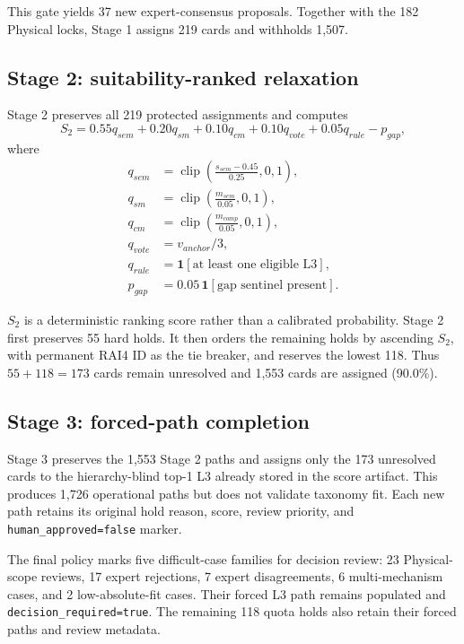 \documentclass[11pt,a4paper]{article}
\newcommand{\code}[1]{\texttt{#1}}
\begin{document}
This gate yields 37 new expert-consensus proposals. Together with the 182
Physical locks, Stage 1 assigns 219 cards and withholds 1,507.

\subsection{Stage 2: suitability-ranked relaxation}

Stage 2 preserves all 219 protected assignments and computes
\begin{equation}
S_2=0.55q_{sem}+0.20q_{sm}+0.10q_{cm}+0.10q_{vote}+0.05q_{rule}-p_{gap},
\end{equation}
where
\begin{align}
q_{sem}&=\operatorname{clip}\left(\frac{s_{sem}-0.45}{0.25},0,1\right),\\
q_{sm}&=\operatorname{clip}\left(\frac{m_{sem}}{0.05},0,1\right),\\
q_{cm}&=\operatorname{clip}\left(\frac{m_{comp}}{0.05},0,1\right),\\
q_{vote}&=v_{anchor}/3,\\
q_{rule}&=\mathbf{1}[\text{at least one eligible L3}],\\
p_{gap}&=0.05\,\mathbf{1}[\text{gap sentinel present}].
\end{align}

$S_2$ is a deterministic ranking score rather than a calibrated probability.
Stage 2 first preserves 55 hard holds. It then orders the remaining holds by
ascending $S_2$, with permanent RAI4 ID as the tie breaker, and reserves the
lowest 118. Thus $55+118=173$ cards remain unresolved and 1,553 cards are
assigned (90.0\%).

\subsection{Stage 3: forced-path completion}

Stage 3 preserves the 1,553 Stage 2 paths and assigns only the 173 unresolved
cards to the hierarchy-blind top-1 L3 already stored in the score artifact.
This produces 1,726 operational paths but does not validate taxonomy fit. Each
new path retains its original hold reason, score, review priority, and
\code{human\_approved=false} marker.

The final policy marks five difficult-case families for decision review:
23 Physical-scope reviews, 17 expert rejections, 7 expert disagreements,
6 multi-mechanism cases, and 2 low-absolute-fit cases. Their forced L3 path
remains populated and \code{decision\_required=true}. The
remaining 118 quota holds also retain their forced paths and review metadata.
\end{document}
